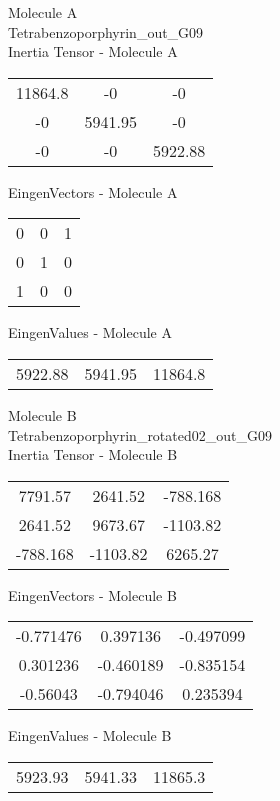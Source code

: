 \begin{multicols}{2}
\begin{center}
Molecule A \\ 
Tetrabenzoporphyrin\_out\_G09
\\
Inertia Tensor - Molecule A \\
\vtab
\begin{tabular}{|c c c|}
11864.8	 & 	-0	 & 	-0	 \\
-0	 & 	5941.95	 & 	-0	 \\
-0	 & 	-0	 & 	5922.88
\end{tabular}

\vtab
 EingenVectors - Molecule A     \\
\vtab
\begin{tabular}{|c c c|}
0	 & 	0	 & 	1	 \\
0	 & 	1	 & 	0	 \\
1	 & 	0	 & 	0
\end{tabular}

\vtab
 EingenValues - Molecule A     \\
\vtab
\begin{tabular}{|c c c|}
5922.88	 & 	5941.95	 & 	11864.8
\end{tabular}
\columnbreak

Molecule B \\ 
Tetrabenzoporphyrin\_rotated02\_out\_G09
\\
Inertia Tensor - Molecule B \\
\vtab
\begin{tabular}{|c c c|}
7791.57	 & 	2641.52	 & 	-788.168	 \\
2641.52	 & 	9673.67	 & 	-1103.82	 \\
-788.168	 & 	-1103.82	 & 	6265.27
\end{tabular}

\vtab
 EingenVectors - Molecule B     \\
\vtab
\begin{tabular}{|c c c|}
-0.771476	 & 	0.397136	 & 	-0.497099	 \\
0.301236	 & 	-0.460189	 & 	-0.835154	 \\
-0.56043	 & 	-0.794046	 & 	0.235394
\end{tabular}

\vtab
 EingenValues - Molecule B     \\
\vtab
\begin{tabular}{|c c c|}
5923.93	 & 	5941.33	 & 	11865.3
\end{tabular}

\end{center}
\end{multicols}
